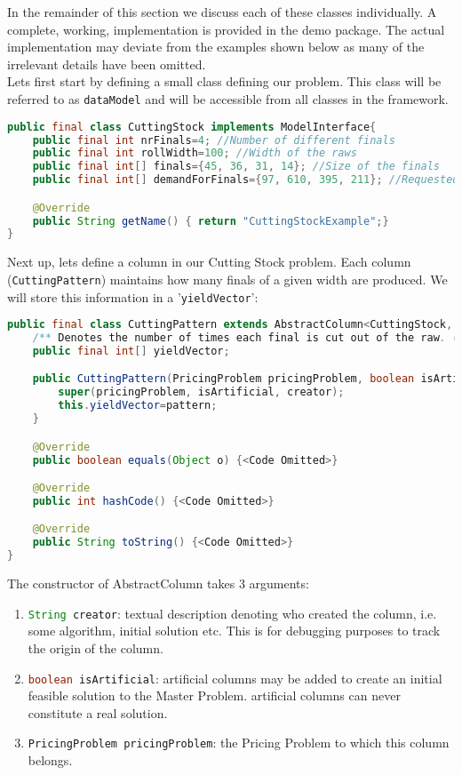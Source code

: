 \documentclass[a4paper]{article}
\newenvironment{myblock}[1]{%
    \tcolorbox[beamer,%
    noparskip,breakable,
    colback=lightBlueCodeBlock,colframe=darkBlueCodeBlock,%
    colbacklower=darkBlueCodeBlock!75!lightBlueCodeBlock,%
    coltitle=blueTitleCodeBlock,
    title=#1]}%
    {\endtcolorbox}
\newcommand{\code}[1]{\lstinline[language=java, style=seminar]!#1!}
\begin{document}
In the remainder of this section we discuss each of these classes individually. A complete, working, implementation is provided in the demo package. The actual implementation may deviate from the examples shown below as many of the irrelevant details have been omitted.\\
Lets first start by defining a small class defining our problem. This class will be referred to as \code{dataModel} and will be accessible from all classes in the framework.
\begin{myblock}{CuttingStock}
\begin{lstlisting}[language=java, style=eclipseArticle, xleftmargin=2em]  
public final class CuttingStock implements ModelInterface{
	public final int nrFinals=4; //Number of different finals
	public final int rollWidth=100; //Width of the raws
	public final int[] finals={45, 36, 31, 14}; //Size of the finals
	public final int[] demandForFinals={97, 610, 395, 211}; //Requested quantity of each final

	@Override
	public String getName() { return "CuttingStockExample";}
}
\end{lstlisting}
\end{myblock}
Next up, lets define a column in our Cutting Stock problem. Each column (\code{CuttingPattern}) maintains how many finals of a given width are produced. We will store this information in a '\code{yieldVector}':
\begin{myblock}{CuttingPattern}
\begin{lstlisting}[language=java, style=eclipseArticle, xleftmargin=2em]  
public final class CuttingPattern extends AbstractColumn<CuttingStock, PricingProblem> {
	/** Denotes the number of times each final is cut out of the raw. (vector a_j)**/
	public final int[] yieldVector;

	public CuttingPattern(PricingProblem pricingProblem, boolean isArtificial, String creator, int[] pattern) {
		super(pricingProblem, isArtificial, creator);
		this.yieldVector=pattern;
	}

	@Override
	public boolean equals(Object o) {<Code Omitted>}

	@Override
	public int hashCode() {<Code Omitted>}

	@Override
	public String toString() {<Code Omitted>}
}
\end{lstlisting}
\end{myblock}
The constructor of AbstractColumn takes 3 arguments:
\begin{enumerate}[nolistsep]
 \item \code{String creator}: textual description denoting who created the column, i.e. some algorithm, initial solution etc. This is for debugging purposes to track the origin of the column.
 \item \code{boolean isArtificial}: artificial columns may be added to create an initial feasible solution to the Master Problem. artificial columns can never constitute a real solution. 
 \item \code{PricingProblem pricingProblem}: the Pricing Problem to which this column belongs. 
\end{enumerate}
\end{document}
